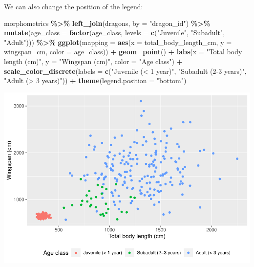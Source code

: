 \documentclass[
]{book}
\newenvironment{Shaded}{\begin{snugshade}}{\end{snugshade}}
\newcommand{\AttributeTok}[1]{\textcolor[rgb]{0.13,0.29,0.53}{#1}}
\newcommand{\FunctionTok}[1]{\textcolor[rgb]{0.13,0.29,0.53}{\textbf{#1}}}
\newcommand{\NormalTok}[1]{#1}
\newcommand{\SpecialCharTok}[1]{\textcolor[rgb]{0.81,0.36,0.00}{\textbf{#1}}}
\newcommand{\StringTok}[1]{\textcolor[rgb]{0.31,0.60,0.02}{#1}}
\begin{document}
We can also change the position of the legend:

\begin{Shaded}
\begin{Highlighting}[]
\NormalTok{morphometrics }\SpecialCharTok{\%\textgreater{}\%} 
  \FunctionTok{left\_join}\NormalTok{(dragons, }\AttributeTok{by =} \StringTok{"dragon\_id"}\NormalTok{) }\SpecialCharTok{\%\textgreater{}\%} 
  \FunctionTok{mutate}\NormalTok{(}\AttributeTok{age\_class =} \FunctionTok{factor}\NormalTok{(age\_class, }\AttributeTok{levels =} \FunctionTok{c}\NormalTok{(}\StringTok{"Juvenile"}\NormalTok{,}
                                                  \StringTok{"Subadult"}\NormalTok{,}
                                                  \StringTok{"Adult"}\NormalTok{))) }\SpecialCharTok{\%\textgreater{}\%} 
\FunctionTok{ggplot}\NormalTok{(}\AttributeTok{mapping =} \FunctionTok{aes}\NormalTok{(}\AttributeTok{x =}\NormalTok{ total\_body\_length\_cm, }\AttributeTok{y =}\NormalTok{ wingspan\_cm, }\AttributeTok{color =}\NormalTok{ age\_class)) }\SpecialCharTok{+}
  \FunctionTok{geom\_point}\NormalTok{() }\SpecialCharTok{+}
  \FunctionTok{labs}\NormalTok{(}\AttributeTok{x =} \StringTok{"Total body length (cm)"}\NormalTok{, }\AttributeTok{y =} \StringTok{"Wingspan (cm)"}\NormalTok{, }\AttributeTok{color =} \StringTok{"Age class"}\NormalTok{) }\SpecialCharTok{+}
  \FunctionTok{scale\_color\_discrete}\NormalTok{(}\AttributeTok{labels =} \FunctionTok{c}\NormalTok{(}\StringTok{"Juvenile (\textless{} 1 year)"}\NormalTok{,}
                                 \StringTok{"Subadult (2{-}3 years)"}\NormalTok{,}
                                 \StringTok{"Adult (\textgreater{} 3 years)"}\NormalTok{)) }\SpecialCharTok{+}
  \FunctionTok{theme}\NormalTok{(}\AttributeTok{legend.position =} \StringTok{"bottom"}\NormalTok{)}
\end{Highlighting}
\end{Shaded}

\includegraphics{reproducible-science_files/figure-latex/gg11b-1.pdf}
\end{document}

